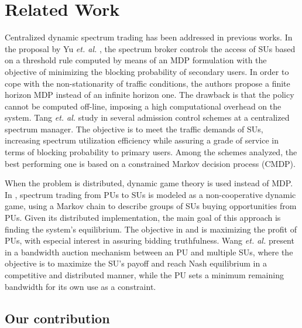 \section{Related Work}\label{sec:Application}

Centralized dynamic spectrum trading has been addressed in previous works. In the proposal by Yu \textit{et. al.} \cite{ref:Yu2007}, the spectrum broker controls the access of SUs based on a threshold rule computed by means of an MDP formulation with the objective of minimizing the blocking probability of secondary users. In order to cope with the non-stationarity of traffic conditions, the authors propose a finite horizon MDP instead of an infinite horizon one. The drawback is that the policy cannot be computed off-line, imposing a high computational overhead on the system.
Tang \textit{et. al.} study in \cite{ref:Tang2009_per} several admission control schemes at a centralized spectrum manager. The objective is to meet the traffic demands of SUs, increasing spectrum utilization efficiency while assuring a grade of service in terms of blocking probability to primary users. Among the schemes analyzed, the best performing one is based on a constrained Markov decision process (CMDP).

When the problem is distributed, dynamic game theory is used instead of MDP.
In \cite{ref:Niyato}, spectrum trading from PUs to SUs is modeled as a non-cooperative dynamic game, using a Markov chain to describe groups of SUs buying opportunities from PUs. Given its distributed implementation, the main goal of this approach is finding the system's equilibrium. The objective in \cite{ref:eBay} and \cite{ref:Jia} is maximizing the profit of PUs, with especial interest in assuring bidding truthfulness. Wang \textit{et. al.} present in \cite{ref:Wang} a bandwidth auction mechanism between an PU and multiple SUs, where the objective is to maximize the SU's payoff and reach Nash equilibrium in a competitive and distributed manner, while the PU sets a minimum remaining bandwidth for its own use as a constraint. 

\subsection{Our contribution}

